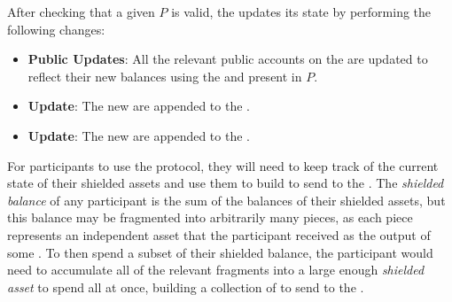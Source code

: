 \begin{definition}
    After checking that a given \TransferPost{} $P$ is valid, the \Ledger{} updates its state by performing the following changes:
    \begin{itemize}
        \item \textbf{Public Updates}: All the relevant public accounts on the \PublicLedger{} are updated to reflect their new balances using the  and  present in $P$.
        \item \textbf{\UTXOSet{} Update}: The new  are appended to the \UTXOSet{}.
        \item \textbf{\VoidNumberSet{} Update}: The new  are appended to the \VoidNumberSet{}.
    \end{itemize}
\end{definition}


For \MantaPay{} participants to use the \Transfer{} protocol, they will need to keep track of the current state of their shielded assets and use them to build  to send to the \Ledger{}. The \emph{shielded balance} of any participant is the sum of the balances of their shielded assets, but this balance may be fragmented into arbitrarily many pieces, as each piece represents an independent asset that the participant received as the output of some \Transfer{}. To then spend a subset of their shielded balance, the participant would need to accumulate all of the relevant fragments into a large enough \emph{shielded asset} to spend all at once, building a collection of  to send to the \Ledger{}.

